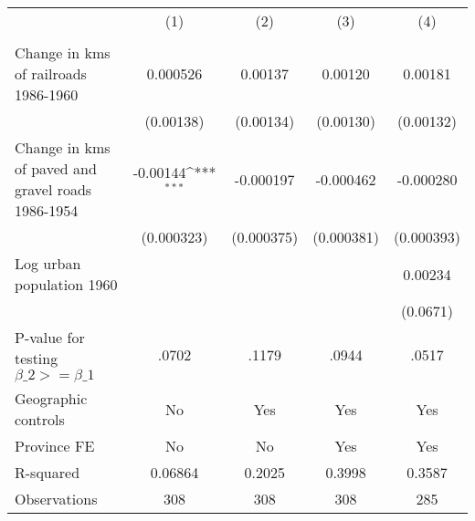 {
\def\sym#1{\ifmmode^{#1}\else\(^{#1}\)\fi}
\begin{tabular}{l*{4}{c}}
\hline\hline
                &\multicolumn{1}{c}{(1)}&\multicolumn{1}{c}{(2)}&\multicolumn{1}{c}{(3)}&\multicolumn{1}{c}{(4)}\\
                &\multicolumn{1}{c}{}&\multicolumn{1}{c}{}&\multicolumn{1}{c}{}&\multicolumn{1}{c}{}\\
\hline
Change in kms of railroads 1986-1960& 0.000526         &  0.00137         &  0.00120         &  0.00181         \\
                &(0.00138)         &(0.00134)         &(0.00130)         &(0.00132)         \\
[1em]
Change in kms of paved and gravel roads 1986-1954& -0.00144\sym{***}&-0.000197         &-0.000462         &-0.000280         \\
                &(0.000323)         &(0.000375)         &(0.000381)         &(0.000393)         \\
[1em]
Log urban population 1960&                  &                  &                  &  0.00234         \\
                &                  &                  &                  & (0.0671)         \\
\hline
P-value for testing $\beta\_{2} >= \beta\_{1}$&    .0702         &    .1179         &    .0944         &    .0517         \\
Geographic controls&       No         &      Yes         &      Yes         &      Yes         \\
Province FE     &       No         &       No         &      Yes         &      Yes         \\
R-squared       &  0.06864         &   0.2025         &   0.3998         &   0.3587         \\
Observations    &      308         &      308         &      308         &      285         \\
\hline\hline
\end{tabular}
}
